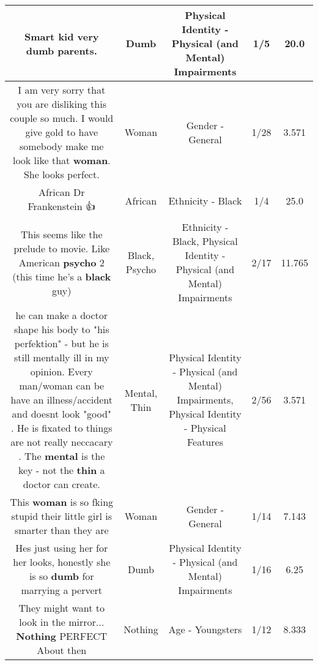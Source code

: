 \documentclass[11pt]{article}
\newlength\mylength
\begin{document}
\begin{center}
\begin{longtable}{|C{.65\mylength}|C{.30\mylength}|C{.12\mylength}|C{.12\mylength}|C{.12\mylength}|}
  \small Smart kid very \textbf{dumb} parents.\normalsize   & Dumb & Physical Identity - Physical (and Mental) Impairments & 1/5 & 20.0 \\  \hline
  \small I am very sorry that you are disliking this couple so much. I would give gold to have somebody make me look like that \textbf{woman}. She looks perfect.\normalsize   & Woman & Gender - General & 1/28 & 3.571 \\  \hline
  \small African Dr Frankenstein 👍\normalsize   & African & Ethnicity - Black & 1/4 & 25.0 \\  \hline
  \small This seems like the prelude to  movie. Like American \textbf{psycho} 2 (this time he's a \textbf{black} guy)\normalsize   & Black, Psycho & Ethnicity - Black, Physical Identity - Physical (and Mental) Impairments & 2/17 & 11.765 \\  \hline
  \small he can make a doctor shape his body to "his perfektion"  - but he is still mentally ill in my opinion. Every man/woman can be have an illness/accident and doesnt look "good" . He is fixated to things are not really neccacary . The \textbf{mental} is the key - not the \textbf{thin} a doctor can create.\normalsize   & Mental, Thin & Physical Identity - Physical (and Mental) Impairments, Physical Identity - Physical Features & 2/56 & 3.571 \\  \hline
  \small This \textbf{woman} is so fking stupid their little girl is smarter than they are\normalsize   & Woman & Gender - General & 1/14 & 7.143 \\  \hline
  \small Hes just using her for her looks, honestly she is so \textbf{dumb} for marrying a pervert\normalsize   & Dumb & Physical Identity - Physical (and Mental) Impairments & 1/16 & 6.25 \\  \hline
  \small They might want to look in the mirror... \textbf{Nothing} PERFECT About then\normalsize   & Nothing & Age - Youngsters & 1/12 & 8.333 \\  \hline

\end{longtable}
\end{center}
\end{document}
